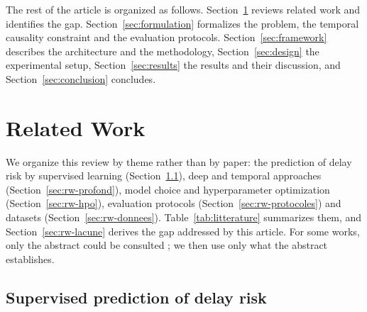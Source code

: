 \documentclass[11pt,a4paper]{article}
\theoremstyle{definition}
\begin{document}
The rest of the article is organized as follows. Section~\ref{sec:relwork} reviews related work and identifies the gap. Section~\ref{sec:formulation} formalizes the problem, the temporal causality constraint and the evaluation protocols. Section~\ref{sec:framework} describes the architecture and the methodology, Section~\ref{sec:design} the experimental setup, Section~\ref{sec:results} the results and their discussion, and Section~\ref{sec:conclusion} concludes.

\section{Related Work}
\label{sec:relwork}

We organize this review by theme rather than by paper: the prediction of delay risk by supervised learning (Section~\ref{sec:rw-supervise}), deep and temporal approaches (Section~\ref{sec:rw-profond}), model choice and hyperparameter optimization (Section~\ref{sec:rw-hpo}), evaluation protocols (Section~\ref{sec:rw-protocoles}) and datasets (Section~\ref{sec:rw-donnees}). Table~\ref{tab:litterature} summarizes them, and Section~\ref{sec:rw-lacune} derives the gap addressed by this article. For some works, only the abstract could be consulted \cite{rezki2024machine,widayanti2026predicting,bhuiyan2026deep,douaioui2024deep,sheridan2013time,pendlebury2019tesseract,hewamalage2023forecast}; we then use only what the abstract establishes.

\subsection{Supervised prediction of delay risk}
\label{sec:rw-supervise}
\end{document}
